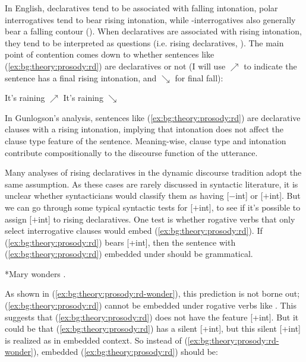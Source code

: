 In English, declaratives tend to be associated with falling intonation, polar interrogatives tend to bear rising intonation, while \twh-interrogatives also generally bear a falling contour (\citealt{ladd1981, hedberg2014corpus}). When declaratives are associated with rising intonation, they tend to be interpreted as questions (i.e. rising declaratives, \citealt{ladd1981,gunlogson2004,gunlogson2008,jeong2018,rudin2018,goodhue2021rd}). The main point of contention comes down to whether sentences like (\ref{ex:bg:theory:prosody:rd}) are declaratives or not (I will use $\nearrow$ to indicate the sentence has a final rising intonation, and $\searrow$ for final fall):
 
It's raining $\nearrow$
\eex
{}
It's raining $\searrow$
\eex


In Gunlogson's \cite*{gunlogson2008} analysis, sentences like (\ref{ex:bg:theory:prosody:rd}) are declarative clauses with a rising intonation, implying that intonation does not affect the clause type feature of the sentence. Meaning-wise, clause type and intonation contribute compositionally to the discourse function of the utterance. 


Many analyses of rising declaratives in the dynamic discourse tradition adopt the same assumption. As these cases are rarely discussed in syntactic literature, it is unclear whether syntacticians would classify them as having [$-$int] or [$+$int]. But we can go through
some typical syntactic tests for
[$+$int], to see if it's possible to assign [$+$int] to
rising declaratives. One test is whether rogative verbs that only select interrogative clauses would embed (\ref{ex:bg:theory:prosody:rd}). If (\ref{ex:bg:theory:prosody:rd}) bears [+int], then the sentence with (\ref{ex:bg:theory:prosody:rd}) embedded under  should be grammatical.

*Mary wonders .
\eex

As shown in (\ref{ex:bg:theory:prosody:rd-wonder}), this prediction is not borne out; (\ref{ex:bg:theory:prosody:rd}) cannot be embedded under rogative verbs like . This suggests that (\ref{ex:bg:theory:prosody:rd}) does not have the feature [+int]. But it could be that (\ref{ex:bg:theory:prosody:rd}) has a silent [+int], but this silent [+int] is realized as  in embedded context. So instead of (\ref{ex:bg:theory:prosody:rd-wonder}), embedded (\ref{ex:bg:theory:prosody:rd}) should be:

